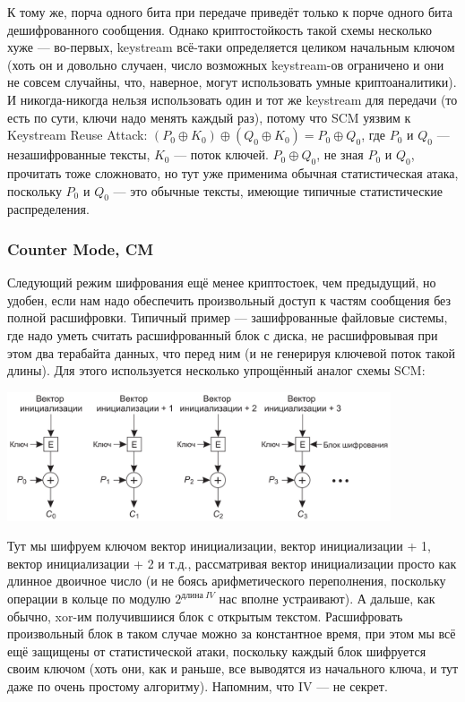 \documentclass{../mcstext}
\begin{document}
К тому же, порча одного бита при передаче приведёт только к порче одного бита дешифрованного сообщения. Однако криптостойкость такой схемы несколько хуже --- во-первых, keystream всё-таки определяется целиком начальным ключом (хоть он и довольно случаен, число возможных keystream-ов ограничено и они не совсем случайны, что, наверное, могут использовать умные криптоаналитики). И никогда-никогда нельзя использовать один и тот же keystream для передачи (то есть по сути, ключи надо менять каждый раз), потому что SCM уязвим к Keystream Reuse Attack: $(P_0 \oplus K_0) \oplus (Q_0 \oplus K_0) = P_0 \oplus Q_0$, где $P_0$ и $Q_0$ --- незашифрованные тексты, $K_0$ --- поток ключей.  $P_0 \oplus Q_0$, не зная $P_0$ и $Q_0$, прочитать тоже сложновато, но тут уже применима обычная статистическая атака, поскольку $P_0$ и $Q_0$ --- это обычные тексты, имеющие типичные статистические распределения.

\subsubsection{Counter Mode, CM}

Следующий режим шифрования ещё менее криптостоек, чем предыдущий, но удобен, если нам надо обеспечить произвольный доступ к частям сообщения без полной расшифровки. Типичный пример --- зашифрованные файловые системы, где надо уметь считать расшифрованный блок с диска, не расшифровывая при этом два терабайта данных, что перед ним (и не генерируя ключевой поток такой длины). Для этого используется несколько упрощённый аналог схемы SCM:

\begin{center}
    \includegraphics[width=0.85\textwidth]{cm.png}
\end{center}

Тут мы шифруем ключом вектор инициализации, вектор инициализации + 1, вектор инициализации + 2 и т.д., рассматривая вектор инициализации просто как длинное двоичное число (и не боясь арифметического переполнения, поскольку операции в кольце по модулю $2^{длина\ IV}$ нас вполне устраивают). А дальше, как обычно, xor-им получившиися блок с открытым текстом. Расшифровать произвольный блок в таком случае можно за константное время, при этом мы всё ещё защищены от статистической атаки, поскольку каждый блок шифруется своим ключом (хоть они, как и раньше, все выводятся из начального ключа, и тут даже по очень простому алгоритму). Напомним, что IV --- не секрет.
\end{document}
